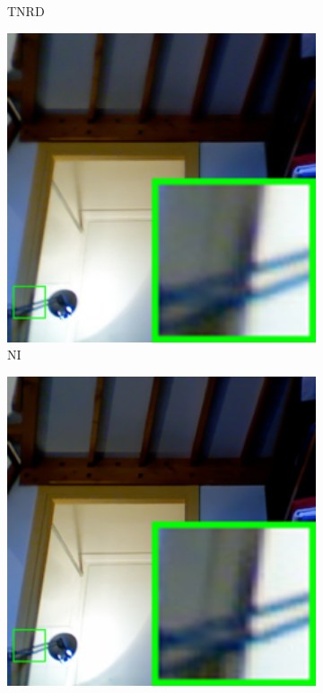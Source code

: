 \begin{figure}
\begin{subfigure}[t]{0.19\textwidth}
\caption{TNRD}
    \end{subfigure}
    \hfill
    \begin{subfigure}[t]{0.19\textwidth}
        \centering
        \includegraphics[width=1\textwidth]{images/mcwnnm/nc/resize_br_NI_room.png}
\caption{NI}
    \end{subfigure}
\hfill
    \begin{subfigure}[t]{0.19\textwidth}
        \centering
        \includegraphics[width=1\textwidth]{images/mcwnnm/nc/resize_br_NC_room.png}

\end{subfigure}
\end{figure}
